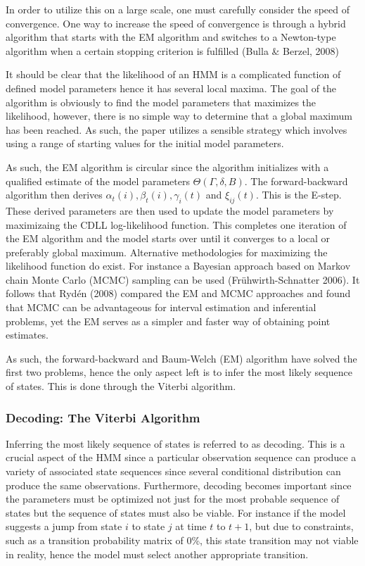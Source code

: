 In order to utilize this on a large scale, one must carefully consider the speed of convergence. One way to increase the speed of convergence is through a hybrid algorithm that starts with the EM algorithm and switches to a Newton-type algorithm when a certain stopping criterion is fulfilled (Bulla \& Berzel, 2008)

It should be clear that the likelihood of an HMM is a complicated function of defined model parameters hence it has several local maxima. The goal of the algorithm is obviously to find the model parameters that maximizes the likelihood, however, there is no simple way to determine that a global maximum has been reached. As such, the paper utilizes a sensible strategy which involves using a range of starting values for the initial model parameters.

As such, the EM algorithm is circular since the algorithm initializes with a qualified estimate of the model parameters $\Theta(\Gamma,\delta, B)$. The forward-backward algorithm then derives $\alpha_t(i), \beta_t(i), \gamma_i(t)$ and $\xi_{ij}(t)$. This is the E-step. These derived parameters are then used to update the model parameters by maximizaing the CDLL log-likelihood function. This completes one iteration of the EM algorithm and the model starts over until it converges to a local or preferably global maximum. Alternative methodologies for maximizing the likelihood function do exist. For instance a Bayesian approach based on Markov chain Monte Carlo (MCMC) sampling can be used (Frühwirth-Schnatter 2006). It follows that Rydén (2008) compared the EM and MCMC approaches and found that MCMC can be advantageous for interval estimation and inferential problems, yet the EM serves as a simpler and faster way of obtaining point estimates.

As such, the forward-backward and Baum-Welch (EM) algorithm have solved the first two problems, hence the only aspect left is to infer the most likely sequence of states. This is done through the Viterbi algorithm. 
 
\subsubsection{Decoding: The Viterbi Algorithm}
\label{subsection: Decoding}
Inferring the most likely sequence of states is referred to as decoding. This is a crucial aspect of the HMM since a particular observation sequence can produce a variety of associated state sequences since several conditional distribution can produce the same observations. Furthermore, decoding becomes important since the parameters must be optimized not just for the most probable sequence of states but the sequence of states must also be viable. For instance if the model suggests a jump from state $i$ to state $j$ at time $t$ to $t+1$, but due to constraints, such as a transition probability matrix of 0\%, this state transition may not viable in reality, hence the model must select another appropriate transition. 

